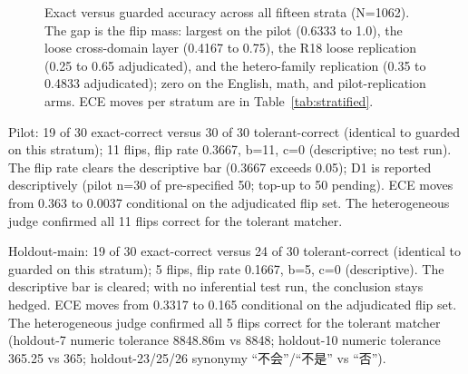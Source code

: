 \documentclass[10pt]{article} %
\begin{document}
\begin{figure}[t]
\centering
{}
\caption{Exact versus guarded accuracy across all fifteen strata (N=1062). The gap is the flip mass: largest on the pilot (0.6333 to 1.0), the loose cross-domain layer (0.4167 to 0.75), the R18 loose replication (0.25 to 0.65 adjudicated), and the hetero-family replication (0.35 to 0.4833 adjudicated); zero on the English, math, and pilot-replication arms. ECE moves per stratum are in Table~\ref{tab:stratified}.}
\label{fig:acc}
\end{figure}

Pilot: 19 of 30 exact-correct versus 30 of 30 tolerant-correct (identical to guarded on this stratum); 11 flips, flip rate 0.3667, b=11, c=0 (descriptive; no test run). The flip rate clears the descriptive bar (0.3667 exceeds 0.05); D1 is reported descriptively (pilot n=30 of pre-specified 50; top-up to 50 pending). ECE moves from 0.363 to 0.0037 conditional on the adjudicated flip set. The heterogeneous judge confirmed all 11 flips correct for the tolerant matcher.

Holdout-main: 19 of 30 exact-correct versus 24 of 30 tolerant-correct (identical to guarded on this stratum); 5 flips, flip rate 0.1667, b=5, c=0 (descriptive). The descriptive bar is cleared; with no inferential test run, the conclusion stays hedged. ECE moves from 0.3317 to 0.165 conditional on the adjudicated flip set. The heterogeneous judge confirmed all 5 flips correct for the tolerant matcher (holdout-7 numeric tolerance 8848.86m vs 8848; holdout-10 numeric tolerance 365.25 vs 365; holdout-23/25/26 synonymy ``不会''/``不是'' vs ``否'').
\end{document}
